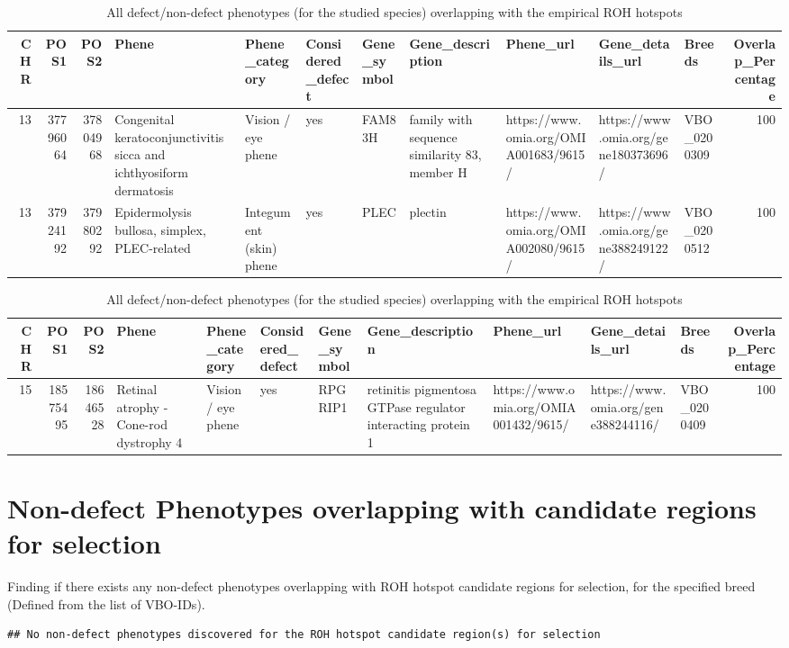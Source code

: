 \documentclass[
]{article}
\begin{document}
\begin{table}
\caption{\label{tab:unnamed-chunk-9}All defect/non-defect phenotypes (for the studied species) overlapping with the empirical ROH hotspots}

\centering
\begin{tabular}[t]{r|r|r|l|l|l|l|l|l|l|l|r}
\hline
CHR & POS1 & POS2 & Phene & Phene\_category & Considered\_defect & Gene\_symbol & Gene\_description & Phene\_url & Gene\_details\_url & Breeds & Overlap\_Percentage\\
\hline
13 & 37796064 & 37804968 & Congenital keratoconjunctivitis sicca and ichthyosiform dermatosis & Vision / eye phene & yes & FAM83H & family with sequence similarity 83, member H & https://www.omia.org/OMIA001683/9615/ & https://www.omia.org/gene180373696/ & VBO\_0200309 & 100\\
\hline
13 & 37924192 & 37980292 & Epidermolysis bullosa, simplex, PLEC-related & Integument (skin) phene & yes & PLEC & plectin & https://www.omia.org/OMIA002080/9615/ & https://www.omia.org/gene388249122/ & VBO\_0200512 & 100\\
\hline
\end{tabular}
\centering
\begin{tabular}[t]{r|r|r|l|l|l|l|l|l|l|l|r}
\hline
CHR & POS1 & POS2 & Phene & Phene\_category & Considered\_defect & Gene\_symbol & Gene\_description & Phene\_url & Gene\_details\_url & Breeds & Overlap\_Percentage\\
\hline
15 & 18575495 & 18646528 & Retinal atrophy - Cone-rod dystrophy 4 & Vision / eye phene & yes & RPGRIP1 & retinitis pigmentosa GTPase regulator interacting protein 1 & https://www.omia.org/OMIA001432/9615/ & https://www.omia.org/gene388244116/ & VBO\_0200409 & 100\\
\hline
\end{tabular}
\end{table}

\section{Non-defect Phenotypes overlapping with candidate regions for
selection}\label{non-defect-phenotypes-overlapping-with-candidate-regions-for-selection}

Finding if there exists any non-defect phenotypes overlapping with ROH
hotspot candidate regions for selection, for the specified breed
(Defined from the list of VBO-IDs).

\begin{verbatim}
## No non-defect phenotypes discovered for the ROH hotspot candidate region(s) for selection
\end{verbatim}
\end{document}
